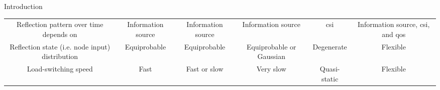 \documentclass[journal]{IEEEtran}
\begin{document}
\begin{section}{Introduction}
\begin{table*}[!t]
\begin{tabularx}{\textwidth}{CCCCCC}
			Reflection pattern over time depends on         & Information source  & Information source & Information source                            & \gls{csi}           & Information source, \gls{csi}, and \gls{qos}                            \\
			Reflection state (i.e. node input) distribution & Equiprobable        & Equiprobable       & Equiprobable or Gaussian                      & Degenerate          & Flexible                                                                \\
			Load-switching speed                            & Fast                & Fast or slow       & Very slow                                     & Quasi-static        & Flexible                                                                \\ \bottomrule
		\end{tabularx}
	\end{table*}


\end{section}
\end{document}
